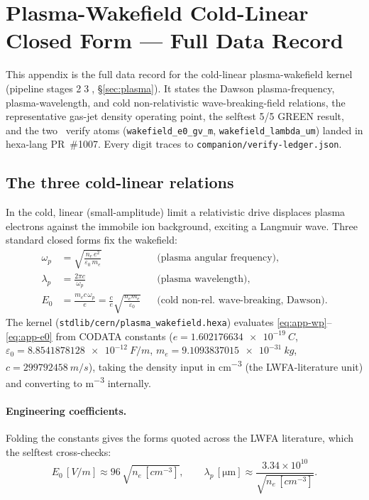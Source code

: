 \section{Plasma-Wakefield Cold-Linear Closed Form --- Full Data Record}
\label{app:wakefield}

This appendix is the full data record for the cold-linear
plasma-wakefield kernel (pipeline stages
\textcircled{\scriptsize 2}\textcircled{\scriptsize 3},
\S\ref{sec:plasma}). It states the Dawson plasma-frequency,
plasma-wavelength, and cold non-relativistic wave-breaking-field
relations, the representative gas-jet density operating point, the
selftest 5/5 GREEN result, and the two \tierGreen\ verify atoms
(\verb|wakefield_e0_gv_m|, \verb|wakefield_lambda_um|) landed in
hexa-lang PR~\#1007. Every digit traces to
\texttt{companion/verify-ledger.json}.

\subsection{The three cold-linear relations}
\label{app:wf-eq}

In the cold, linear (small-amplitude) limit a relativistic drive
displaces plasma electrons against the immobile ion background, exciting
a Langmuir wave. Three standard closed forms
\citep{dawson1959,esarey2009lpa} fix the wakefield:
\begin{align}
\omega_p &= \sqrt{\frac{n_e\,e^{2}}{\varepsilon_0\,m_e}}
   && \text{(plasma angular frequency)}, \label{eq:app-wp}\\[2pt]
\lambda_p &= \frac{2\pi c}{\omega_p}
   && \text{(plasma wavelength)}, \label{eq:app-lam}\\[2pt]
E_0 &= \frac{m_e c\,\omega_p}{e}
   = \frac{c}{e}\sqrt{\frac{n_e m_e}{\varepsilon_0}}
   && \text{(cold non-rel.\ wave-breaking, Dawson)}. \label{eq:app-e0}
\end{align}
The kernel (\verb|stdlib/cern/plasma_wakefield.hexa|) evaluates
\eqref{eq:app-wp}--\eqref{eq:app-e0} from CODATA constants
($e=\SI{1.602176634e-19}{C}$, $\varepsilon_0=\SI{8.8541878128e-12}{F/m}$,
$m_e=\SI{9.1093837015e-31}{kg}$, $c=\SI{299792458}{m/s}$), taking the
density input in \si{cm^{-3}} (the LWFA-literature unit) and converting
to \si{m^{-3}} internally.

\paragraph{Engineering coefficients.} Folding the constants gives the
forms quoted across the LWFA literature, which the selftest cross-checks:
\begin{equation}
E_0\,[\si{V/m}] \approx 96\,\sqrt{n_e\,[\si{cm^{-3}}]},
\qquad
\lambda_p\,[\si{\micro\meter}] \approx
   \frac{3.34\times 10^{10}}{\sqrt{n_e\,[\si{cm^{-3}}]}}.
\label{eq:app-coeff}
\end{equation}

